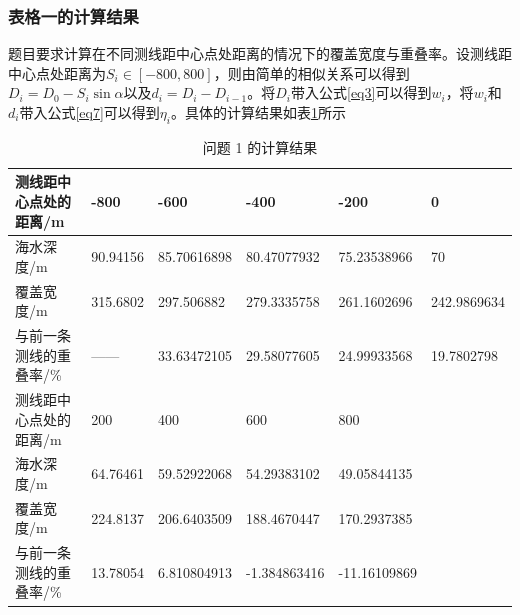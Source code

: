 \documentclass{article}
\begin{document}
\subsubsection{表格一的计算结果}
	\par 题目要求计算在不同测线距中心点处距离的情况下的覆盖宽度与重叠率。设测线距中心点处距离为$S_i\in[-800,800]$，则由简单的相似关系可以得到$D_i=D_0 - S_i\sin\alpha$以及$d_i = D_i-D_{i-1}$。将$D_i$带入公式\eqref{eq3}可以得到$w_i$，将$w_i$和$d_i$带入公式\eqref{eq7}可以得到$\eta_{i}$。具体的计算结果如表\ref{ansSheet1}所示

\begin{table}[H]
	\caption{问题 1 的计算结果}\label{ansSheet1}
	\begin{tabular}{llllll}
		\hline
		测线距中心点处的距离/m  & -800     & -600        & -400         & -200         &  0\\ \hline
		海水深度/m        & 90.94156 & 85.70616898 & 80.47077932  & 75.23538966  & 70                     \\
		覆盖宽度/m        & 315.6802 & 297.506882  & 279.3335758  & 261.1602696  & 242.9869634            \\
		与前一条测线的重叠率/\% & ——       & 33.63472105 & 29.58077605  & 24.99933568  & 19.7802798             \\ \hline
		测线距中心点处的距离/m  & 200      & 400         & 600          & 800          &                        \\ \hline
		海水深度/m        & 64.76461 & 59.52922068 & 54.29383102  & 49.05844135  &                        \\
		覆盖宽度/m        & 224.8137 & 206.6403509 & 188.4670447  & 170.2937385  &                        \\
		与前一条测线的重叠率/\% & 13.78054 & 6.810804913 & -1.384863416 & -11.16109869 &                        \\ \hline
	\end{tabular}
\end{table}
\end{document}
